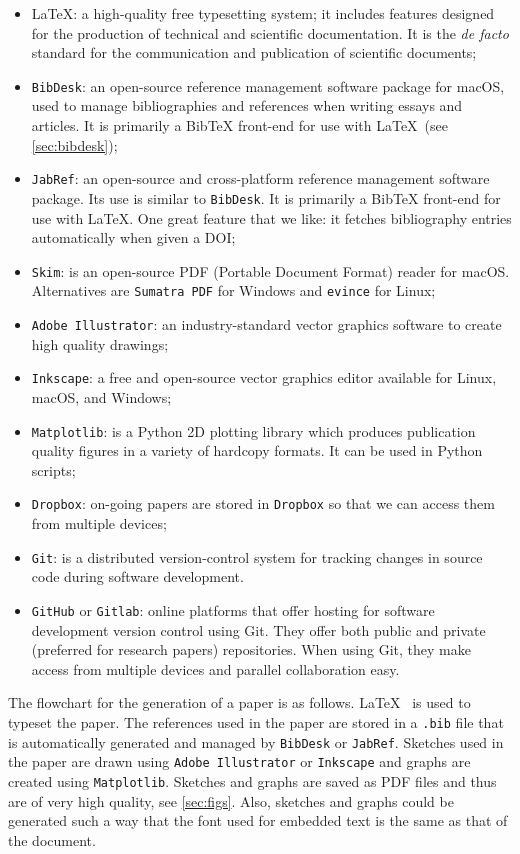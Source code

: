 \documentclass[authoryear,12pta4paper,fleqn]{article}
\numberwithin{equation}{section}
\theoremstyle{remark}
\begin{document}
\begin{itemize}
\item \LaTeX:  a high-quality free typesetting system; it includes features designed for the production of technical and scientific documentation. It is the \textit{de facto} standard for the communication and publication of scientific documents; 
\item \texttt{BibDesk}: an open-source reference management software package for macOS, used to manage bibliographies and references when writing essays and articles. It is primarily a BibTeX front-end for use with \LaTeX\ (see \cref{sec:bibdesk});
\item \texttt{JabRef}:  an open-source and cross-platform reference management software package. Its use is similar to \texttt{BibDesk}. It is primarily a BibTeX front-end for use with \LaTeX. One great feature that we like: it fetches bibliography entries automatically when given a DOI;
\item \texttt{Skim}: is an open-source PDF (Portable Document Format) reader for macOS. Alternatives are \texttt{Sumatra PDF} for Windows and \texttt{evince} for Linux;
\item \texttt{Adobe Illustrator}: an industry-standard vector graphics software to create high quality drawings;
\item \texttt{Inkscape}: a free and open-source vector graphics editor available for Linux, macOS, and Windows;
\item \texttt{Matplotlib}: is a Python 2D plotting library which produces publication quality figures in a variety of hardcopy formats. It can be used in Python scripts;
\item \texttt{Dropbox}: on-going papers are stored in \texttt{Dropbox} so that we can access them from multiple devices;
\item \texttt{Git}: is a distributed version-control system for tracking changes in source code during software development.
\item \texttt{GitHub} or \texttt{Gitlab}: online platforms that offer hosting for software development version control using Git. They offer both public and private (preferred for research papers) repositories. When using Git, they make access from multiple devices and parallel collaboration easy.
\end{itemize}

The flowchart for the generation of a paper is as follows. \LaTeX~ is used to typeset the paper. The references used in the paper are stored in a \texttt{.bib} file that is automatically generated and managed by \texttt{BibDesk} or \texttt{JabRef}. Sketches used in the paper are drawn using \texttt{Adobe Illustrator} or \texttt{Inkscape} and graphs are created using \texttt{Matplotlib}. Sketches and graphs are saved as PDF files and thus are of very high quality, see \cref{sec:figs}. Also, sketches and graphs could be generated such a way that the font used for embedded text is the same as that of the  document.
\end{document}

